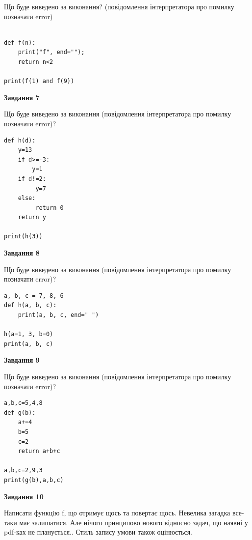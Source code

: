 \documentclass[12pt, ukrainian]{article}
\begin{document}
{\begin {large}
Що буде виведено за виконання? (повідомлення інтерпретатора про помилку позначати error)\par
\begin{verbatim}

def f(n):
    print("f", end="");
    return n<2

print(f(1) and f(9))
\end{verbatim}

{\begin {center}\textbf{Завдання 7}\end {center}}

Що буде виведено за виконання (повідомлення інтерпретатора про помилку позначати error)?\par
\begin{verbatim}
def h(d):
    y=13
    if d>=-3: 
        y=1
    if d!=2:
         y=7
    else:
         return 0
    return y

print(h(3))
\end{verbatim}

{\begin {center}\textbf{Завдання 8}\end {center}}

Що буде виведено за виконання (повідомлення інтерпретатора про помилку позначати error)?\par
\begin{verbatim}
a, b, c = 7, 8, 6
def h(a, b, c):
    print(a, b, c, end=" ")

h(a=1, 3, b=0)
print(a, b, c)
\end{verbatim}

{\begin {center}\textbf{Завдання 9}\end {center}}

Що буде виведено за виконання (повідомлення інтерпретатора про помилку позначати error)?\par
\begin{verbatim}
a,b,c=5,4,8
def g(b):
    a+=4
    b=5
    c=2
    return a+b+c

a,b,c=2,9,3
print(g(b),a,b,c)
\end{verbatim}

{\begin {center}\textbf{Завдання 10}\end {center}}


Написати функцiю f, що отримує щось та повертає щось. Невелика загадка все-таки має залишатися. Але нічого принципово нового відносно задач, що наявні у pdf-ках не планується.. Стиль запису умови також оцінюється.\par
\end {large}}
\newpage
\end{document}
